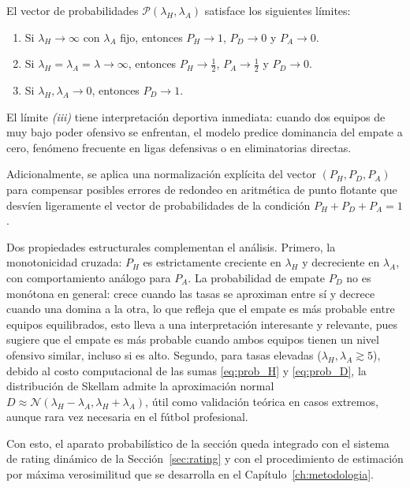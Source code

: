 \begin{obs}
	\label{obs:limites_modelo}
	El vector de probabilidades $\mathcal{P}(\lambda_H,\lambda_A)$ satisface los siguientes l\'imites:
	\begin{enumerate}
		\item[(i)] Si $\lambda_H \to \infty$ con $\lambda_A$ fijo, entonces $P_H \to 1$, $P_D \to 0$ y $P_A \to 0$.
		\item[(ii)] Si $\lambda_H = \lambda_A = \lambda \to \infty$, entonces $P_H \to \tfrac{1}{2}$, $P_A \to \tfrac{1}{2}$ y $P_D \to 0$.
		\item[(iii)] Si $\lambda_H, \lambda_A \to 0$, entonces $P_D \to 1$.
	\end{enumerate}
	El l\'imite \textit{(iii)} tiene interpretaci\'on deportiva inmediata: cuando dos equipos de muy bajo poder ofensivo se enfrentan, el modelo predice dominancia del empate a cero, fen\'omeno frecuente en ligas defensivas o en eliminatorias directas.
\end{obs}

Adicionalmente, se aplica una normalizaci\'on expl\'icita del vector $(P_H, P_D, P_A)$ para compensar posibles errores de redondeo en aritm\'etica de punto flotante que desv\'ien ligeramente el vector de probabilidades de la condici\'on $P_H+P_D+P_A=1$.

Dos propiedades estructurales complementan el an\'alisis. Primero, la monotonicidad cruzada: $P_H$ es estrictamente creciente en $\lambda_H$ y decreciente en $\lambda_A$, con comportamiento an\'alogo para $P_A$. La probabilidad de empate $P_D$ no es mon\'otona en general: crece cuando las tasas se aproximan entre s\'i y decrece cuando una domina a la otra, lo que refleja que el empate es m\'as probable entre equipos equilibrados, esto lleva a una interpretaci\'on interesante y relevante, pues sugiere que el empate es m\'as probable cuando ambos equipos tienen un nivel ofensivo similar, incluso si es alto. Segundo, para tasas elevadas ($\lambda_H, \lambda_A \gtrsim 5$), debido al costo computacional de las sumas \eqref{eq:prob_H} y \eqref{eq:prob_D}, la distribuci\'on de Skellam admite la aproximaci\'on normal $D \approx \mathcal{N}(\lambda_H - \lambda_A, \lambda_H + \lambda_A)$, \'util como validaci\'on te\'orica en casos extremos, aunque rara vez necesaria en el f\'utbol profesional.

Con esto, el aparato probabil\'istico de la secci\'on queda integrado con el sistema de rating din\'amico de la Secci\'on~\ref{sec:rating} y con el procedimiento de estimaci\'on por m\'axima verosimilitud que se desarrolla en el Cap\'itulo~\ref{ch:metodologia}.


